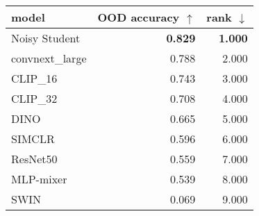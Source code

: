 \begin{tabular}{lrr}
\toprule
          model & OOD accuracy $\uparrow$ & rank $\downarrow$ \\
\midrule
  Noisy Student &          \textbf{0.829} &    \textbf{1.000} \\
convnext\_large &                   0.788 &             2.000 \\
       CLIP\_16 &                   0.743 &             3.000 \\
       CLIP\_32 &                   0.708 &             4.000 \\
           DINO &                   0.665 &             5.000 \\
         SIMCLR &                   0.596 &             6.000 \\
       ResNet50 &                   0.559 &             7.000 \\
      MLP-mixer &                   0.539 &             8.000 \\
           SWIN &                   0.069 &             9.000 \\
\bottomrule
\end{tabular}

